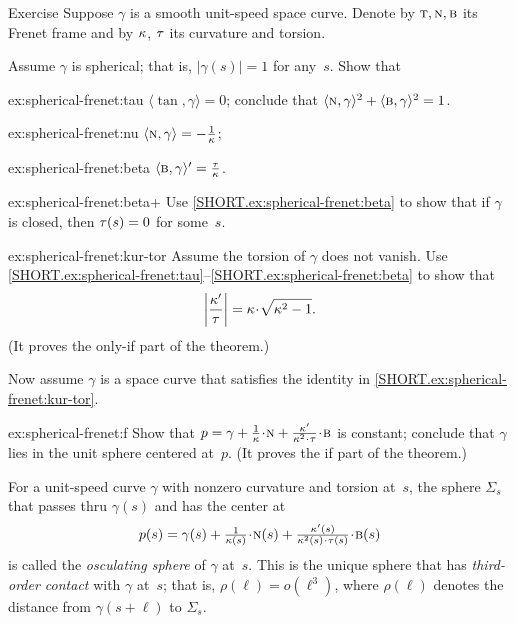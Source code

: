 \begin{thm}{Exercise}\label{ex:spherical-frenet}
Suppose $\gamma$ is a smooth unit-speed space curve.
Denote by $\text{\sc{t}},\text{\sc{n}},\text{\sc{b}}$ its Frenet frame and by $\kappa$, $\tau$ its curvature and torsion.

\smallskip

Assume $\gamma$ is spherical; that is, $|\gamma(s)|=1$ for any~$s$.
Show that

\begin{subthm}{ex:spherical-frenet:tau} $\langle\tan,\gamma\rangle=0$; conclude that $\langle\text{\sc{n}},\gamma\rangle^2+\langle\text{\sc{b}},\gamma\rangle^2=1$.
\end{subthm}

\begin{subthm}{ex:spherical-frenet:nu} $\langle\text{\sc{n}},\gamma\rangle=-\tfrac1{\kappa}$;
\end{subthm}

\begin{subthm}{ex:spherical-frenet:beta} $\langle\text{\sc{b}},\gamma\rangle'=\tfrac{\tau}{\kappa}$.
\end{subthm}

\begin{subthm}{ex:spherical-frenet:beta+}
Use \ref{SHORT.ex:spherical-frenet:beta} to show that if $\gamma$ is closed, then $\tau(s)=0$ for some~$s$.
\end{subthm}

\begin{subthm}{ex:spherical-frenet:kur-tor} Assume the torsion of $\gamma$ does not vanish.
Use \ref{SHORT.ex:spherical-frenet:tau}--\ref{SHORT.ex:spherical-frenet:beta} to show that 
\[\left|\frac{\kur'}{\tor}\right|=\kur\cdot\sqrt{\kur^2-1}.\]
(It proves the only-if part of the theorem.)
\end{subthm}
Now assume $\gamma$ is a space curve that satisfies the identity in \ref{SHORT.ex:spherical-frenet:kur-tor}.
\begin{subthm}{ex:spherical-frenet:f} Show that $p=\gamma+\tfrac1\kur\cdot \norm+\tfrac{\kur'}{\kur^2\cdot\tor}\cdot\bi$ is constant; conclude that $\gamma$ lies in the unit sphere centered at~$p$.
(It proves the if part of the theorem.)
\end{subthm}

\end{thm}

For a unit-speed curve $\gamma$ with nonzero curvature and torsion at~$s$,
the sphere $\Sigma_s$ that passes thru $\gamma(s)$ and has the center at
\[p(s)=\gamma(s)+\tfrac1{\kur(s)}\cdot \norm(s)+\tfrac{\kur'(s)}{\kur^2(s)\cdot\tor(s)}\cdot\bi(s)\]
 is called the \emph{osculating sphere} of $\gamma$ at~$s$.
This is the unique sphere that has \emph{third-order contact} with $\gamma$ at~$s$;
that is, $\rho(\ell)=o(\ell^3)$, where $\rho(\ell)$ denotes the distance from $\gamma(s+\ell)$ to $\Sigma_s$.
 
